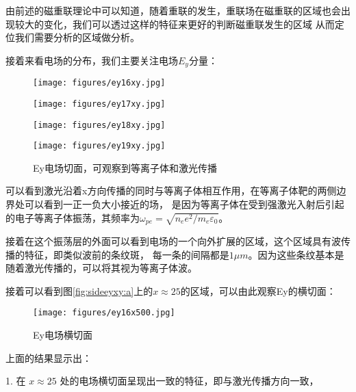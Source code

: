 由前述的磁重联理论中可以知道，随着重联的发生，重联场在磁重联的区域也会出现较大的变化，我们可以透过这样的特征来更好的判断磁重联发生的区域
从而定位我们需要分析的区域做分析。

接着来看电场的分布，我们主要关注电场$E_y$分量：
\begin{figure}[H]
    \begin{minipage}[t]{0.5\linewidth}
        \centering
        \texttt{[image: figures/ey16xy.jpg]}
        \label{fig:sideeyxy:a}
    \end{minipage}%
    \begin{minipage}[t]{0.5\linewidth}
        \centering
        \texttt{[image: figures/ey17xy.jpg]}
        \label{fig:sideeyxy:b}
    \end{minipage}
    \begin{minipage}[t]{0.5\linewidth}
        \centering
        \texttt{[image: figures/ey18xy.jpg]}
        \label{fig:sideeyxy:c}
    \end{minipage}%
    \begin{minipage}[t]{0.5\linewidth}
        \centering
        \texttt{[image: figures/ey19xy.jpg]}
        \label{fig:sideeyxy:d}
    \end{minipage}
    \caption{Ey电场切面，可观察到等离子体和激光传播}
    \label{fig:combined}

\end{figure}

可以看到激光沿着x方向传播的同时与等离子体相互作用，在等离子体靶的两侧边界处可以看到一正一负大小接近的场，
是因为等离子体在受到强激光入射后引起的电子等离子体振荡\cite{1923Sci....58..290L}，其频率为$\omega_{pe} = \sqrt{n_e e^2/m_e \varepsilon_0}$。

接着在这个振荡层的外面可以看到电场的一个向外扩展的区域，这个区域具有波传播的特征，即类似波前的条纹斑，
每一条的间隔都是$1\mu m$。因为这些条纹基本是随着激光传播的，可以将其视为等离子体波。

接着可以看到图\ref{fig:sideeyxy:a}上的$x\approx 25$的区域，可以由此观察Ey的横切面：

\begin{figure}[H]
    \centering
    \texttt{[image: figures/ey16x500.jpg]}
    \caption{Ey电场横切面}
    \label{ey16_heng}
\end{figure}

上面的结果显示出：

1. 在 $x \approx 25$ 处的电场横切面呈现出一致的特征，即与激光传播方向一致，

